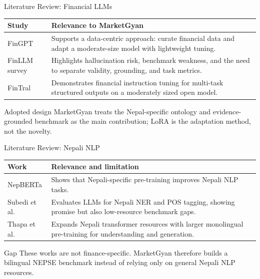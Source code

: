 \documentclass[aspectratio=169,11pt]{beamer}
\begin{document}
\begin{frame}{Literature Review: Financial LLMs}
  \begin{tabularx}{\textwidth}{@{}lY@{}}
    \toprule
    Study & Relevance to MarketGyan \\
    \midrule
    FinGPT & Supports a data-centric approach: curate financial data and adapt a moderate-size model with lightweight tuning. \\
    FinLLM survey & Highlights hallucination risk, benchmark weakness, and the need to separate validity, grounding, and task metrics. \\
    FinTral & Demonstrates financial instruction tuning for multi-task structured outputs on a moderately sized open model. \\
    \bottomrule
  \end{tabularx}

  \vspace{0.24cm}
  \begin{block}{Adopted design}
    MarketGyan treats the Nepal-specific ontology and evidence-grounded benchmark as the main contribution; LoRA is the adaptation method, not the novelty.
  \end{block}
\end{frame}

\begin{frame}{Literature Review: Nepali NLP}
  \begin{tabularx}{\textwidth}{@{}lY@{}}
    \toprule
    Work & Relevance and limitation \\
    \midrule
    NepBERTa & Shows that Nepali-specific pre-training improves Nepali NLP tasks. \\
    Subedi et al. & Evaluates LLMs for Nepali NER and POS tagging, showing promise but also low-resource benchmark gaps. \\
    Thapa et al. & Expands Nepali transformer resources with larger monolingual pre-training for understanding and generation. \\
    \bottomrule
  \end{tabularx}

  \vspace{0.24cm}
  \begin{alertblock}{Gap}
    These works are not finance-specific. MarketGyan therefore builds a bilingual NEPSE benchmark instead of relying only on general Nepali NLP resources.
  \end{alertblock}
\end{frame}
\end{document}
